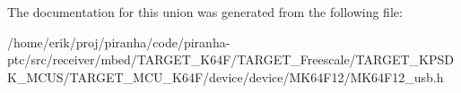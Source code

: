 The documentation for this union was generated from the following file\+:\begin{DoxyCompactItemize}
\item 
/home/erik/proj/piranha/code/piranha-\/ptc/src/receiver/mbed/\+T\+A\+R\+G\+E\+T\+\_\+\+K64\+F/\+T\+A\+R\+G\+E\+T\+\_\+\+Freescale/\+T\+A\+R\+G\+E\+T\+\_\+\+K\+P\+S\+D\+K\+\_\+\+M\+C\+U\+S/\+T\+A\+R\+G\+E\+T\+\_\+\+M\+C\+U\+\_\+\+K64\+F/device/device/\+M\+K64\+F12/M\+K64\+F12\+\_\+usb.\+h\end{DoxyCompactItemize}

